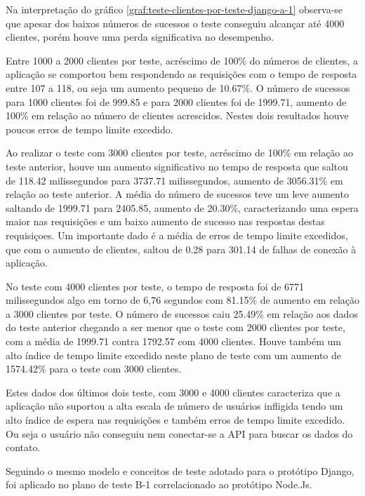   Na interpretação do gráfico \ref{graf:teste-clientes-por-teste-django-a-1}  observa-se que apesar dos baixos números de sucessos o teste
  conseguiu alcançar até 4000 clientes, porém houve uma perda significativa no desempenho. 
  
  Entre 1000 a 2000 clientes por teste, acréscimo de 100\% do números de clientes, a aplicação se comportou bem respondendo as requisições com o tempo de resposta entre 
  107 a 118, ou seja um aumento pequeno de 10.67\%. O número de sucessos para 1000 clientes foi de 999.85 e para 2000 clientes foi de 1999.71, aumento
  de 100\% em relação ao número de clientes acrescidos. Nestes dois resultados houve poucos erros de tempo limite excedido. 
  
  Ao realizar o teste com 3000 clientes por teste, acréscimo de 100\% em relação ao teste anterior, houve um aumento significativo no tempo de resposta 
  que saltou de 118.42 milissegundos para 3737.71 milissegundos, aumento de  3056.31\% em relação ao teste anterior. A média do número de sucessos 
  teve um leve aumento saltando de 1999.71 para 2405.85, aumento de 20.30\%, caracterizando uma espera maior nas requisições e um baixo aumento
  de sucesso nas respostas destas requisiçoes. Um importante dado é a média de erros de tempo limite excedidos, que com o aumento de clientes,
  saltou de 0.28 para 301.14 de falhas de conexão à aplicação.
  
  No teste com 4000 clientes por teste, o tempo de resposta foi de 6771 milissegundos algo em torno de 6,76 segundos com  81.15\% de aumento
  em relação a 3000 clientes por teste. O número de sucessos caiu 25.49\% em relação aos dados do teste anterior chegando a ser menor que o
  teste com 2000 clientes por teste, com a média de 1999.71 contra 1792.57 com 4000 clientes. Houve também um alto índice de tempo limite excedido 
  neste plano de teste com um aumento de 1574.42\% para o teste com 3000 clientes. 
  
  Estes dados dos últimos dois teste, com 3000 e 4000 clientes caracteriza que a aplicação não suportou a alta escala de número de usuários infligida
  tendo um alto índice de espera nas requisições e também erros de tempo limite excedido. Ou seja o usuário não conseguiu nem conectar-se
  a API para buscar os dados do contato.
  
  Seguindo o mesmo modelo e conceitos de teste adotado para o protótipo Django, foi aplicado no plano de teste 
  B-1 correlacionado ao protótipo Node.Js. 
   

